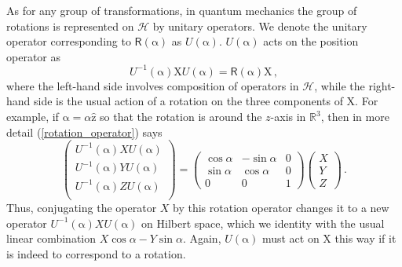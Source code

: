\documentclass{article}
\theoremstyle{plain}\theoremheaderfont{\normalfont\itshape}\theorembodyfont{\rmfamily}\theoremseparator{.}\newtheorem*{rem}{Remark}\newtheorem*{ex}{Example}\newtheorem*{proof}{Proof}\newtheorem*{altp}{Alternative proof}
\theoremstyle{plain}\theoremheaderfont{\normalfont\bfseries}\theorembodyfont{\rmfamily}\theoremseparator{.}\newtheorem{thm}{Theorem}[section]\newtheorem{lem}[thm]{Lemma}\newtheorem{prop}[thm]{Proposition}\newtheorem*{cor}{Corollary}\newtheorem{defn}[thm]{Definition}\newtheorem{clm}[thm]{Claim}\newtheorem{clminproof}{Claim}
\theoremstyle{break}\theoremheaderfont{\normalfont\itshape}\theorembodyfont{\rmfamily}\theoremseparator{.\medskip}\newtheorem*{proofskip}{Proof}\newtheorem*{exs}{Examples}\newtheorem*{rems}{Remarks}
\theoremstyle{break}\theoremheaderfont{\normalfont\bfseries}\theorembodyfont{\rmfamily}\theoremseparator{.\medskip}\newtheorem{lemskip}[thm]{Lemma}\newtheorem{defnskip}[thm]{Definition}\newtheorem{propskip}[thm]{Proposition}\newtheorem{thmskip}[thm]{Theorem}
\numberwithin{equation}{section}
\newcommand{\vb}[1]{\bm{\mathrm{#1}}}
\newcommand{\hb}{\mathcal{H}}
\newcommand{\RR}{\mathbb{R}}
\begin{document}
    As for any group of transformations, in quantum mechanics the group of rotations is represented on \(\hb\) by unitary operators. We denote the unitary operator corresponding to \(\mathsf{R}(\vb{\alpha})\) as \(U(\vb{\alpha})\). \(U(\vb{\alpha})\) acts on the position operator as
    \begin{equation}\label{rotation_operator}
        U^{-1}(\vb{\alpha})\vb{X}U(\vb{\alpha})=\mathsf{R}(\vb{\alpha})\vb{X}\,,
    \end{equation}
    where the left-hand side involves composition of operators in \(\hb\), while the right-hand side is the usual action of a rotation on the three components of \(\vb{X}\). For example, if \(\vb{\alpha}=\alpha\hat{\vb{z}}\) so that the rotation is around the \(z\)-axis in \(\RR^3\), then in more detail (\ref{rotation_operator}) says
    \begin{equation}
        \begin{pmatrix}
        U^{-1}(\vb{\alpha})XU(\vb{\alpha})\\
        U^{-1}(\vb{\alpha})YU(\vb{\alpha})\\
        U^{-1}(\vb{\alpha})ZU(\vb{\alpha})\\
    \end{pmatrix}=\begin{pmatrix}
        \cos\alpha & -\sin\alpha & 0\\
        \sin\alpha & \cos\alpha & 0\\
        0 & 0 & 1
    \end{pmatrix}\begin{pmatrix}
        X \\ Y \\ Z
    \end{pmatrix}\,.
    \end{equation}
    Thus, conjugating the operator \(X\) by this rotation operator changes it to a new operator \(U^{-1}(\vb{\alpha})XU(\vb{\alpha})\) on Hilbert space, which we identity with the usual linear combination \(X\cos\alpha-Y\sin\alpha\). Again, \(U(\vb{\alpha})\) must act on \(\vb{X}\) this way if it is indeed to correspond to a rotation.
\end{document}
